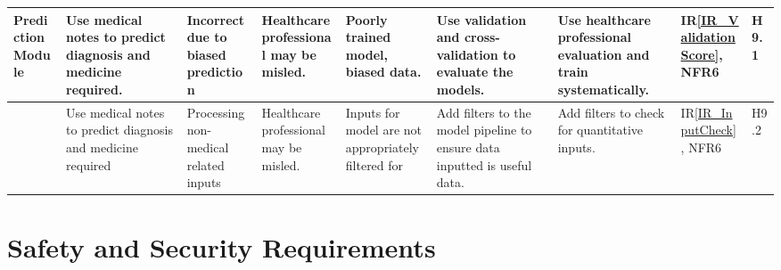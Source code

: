 \documentclass{article}
\begin{document}
\begin{landscape}
\begin{longtable}{|p{1.5cm}|p{2cm}|p{2.6cm}|p{2cm}|p{2cm}|p{2cm}|p{3.5cm}|p{1cm}|p{0.8cm}|}
        \midrule
        Prediction Module & \raggedright Use medical notes to predict diagnosis and medicine required. & \raggedright Incorrect due to biased prediction & \raggedright Healthcare professional may be misled. & \raggedright Poorly trained model, biased data. & \raggedright Use validation and cross-validation to evaluate the models. & \raggedright Use healthcare professional evaluation and train systematically. & IR\ref{IR_ValidationScore}, NFR6 & H9.1 \\
        \midrule
        & \raggedright Use medical notes to predict diagnosis and medicine required & \raggedright Processing non-medical related inputs & \raggedright Healthcare professional may be misled. & \raggedright Inputs for model are not appropriately filtered for & \raggedright Add filters to the model pipeline to ensure data inputted is useful data. & \raggedright Add filters to check for quantitative inputs. & IR\ref{IR_InputCheck}, NFR6 & H9.2 \\ 
        \bottomrule
    \end{longtable}
    
    
\end{landscape}

\section{Safety and Security Requirements}
\end{document}
